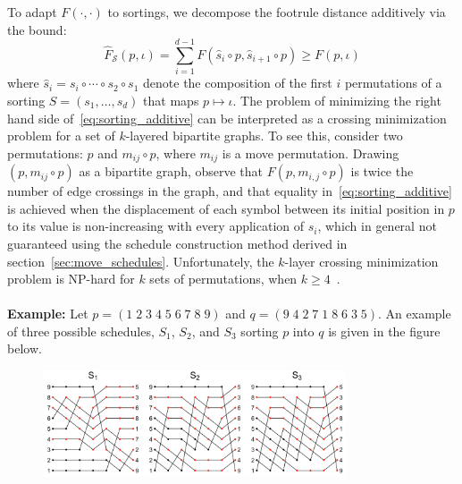 \documentclass[sn-mathphys]{sn-jnl}
\DeclareMathOperator*{\argmin}{arg\,min}
\begin{document}
To adapt $F(\cdot, \cdot)$ to sortings, we decompose the footrule distance additively via the bound:
\begin{equation}\label{eq:sorting_additive}
\hat{F}_{\mathcal{S}}(p, \iota) = \sum\limits_{i=1}^{d-1} F(\hat{s}_i \circ p, \hat{s}_{i+1} \circ p) \geq F(p, \iota)
\end{equation}
where $\hat{s}_i =  s_i \circ \cdots \circ s_2 \circ s_1$ denote the composition of the first $i$ permutations of a sorting  $S = (s_1, \dots, s_d)$ that maps $p \mapsto \iota$.
The problem of minimizing the right hand side of~\eqref{eq:sorting_additive} can be interpreted as a crossing minimization problem for a set of $k$-layered bipartite graphs. To see this, consider two permutations: $p$ and $m_{ij} \circ p$, where $m_{ij}$ is a move permutation. Drawing $(p, m_{ij} \circ p)$ as a bipartite graph,  observe that $F(p, m_{i,j} \circ p)$ is twice the number of edge crossings in the graph, and that equality in~\eqref{eq:sorting_additive} is achieved when the displacement of each symbol between its initial position in $p$ to its value is non-increasing with every application of $s_i$, which in general not guaranteed using the schedule construction method derived in section~\ref{sec:move_schedules}. Unfortunately, the $k$-layer crossing minimization problem is NP-hard for $k$ sets of permutations, when $k \geq 4$~\cite{biedl2009complexity}. 
\\
\\
\noindent \textbf{Example:} 
Let  $p= (1\;2\;3\;4\;5\;6\;7\;8\;9)$ and $q = (9\;4\;2\;7\;1\;8\;6\;3\;5)$.
An example of three possible schedules, $S_1$, $S_2$, and $S_3$ sorting $p$ into $q$ is given in the figure below. 
\begin{figure}[!htb]
    \centering
    \includegraphics[width=0.80\textwidth]{crossings.png}
    \label{fig:crossings}
\end{figure}
\end{document}
